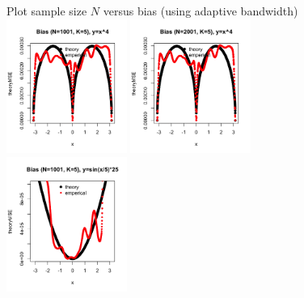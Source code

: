 \documentclass{article}
\begin{document}
\begin{itemize}
\begin{figure}[H]
Plot sample size $N$ versus bias (using adaptive bandwidth)\\
\includegraphics[width=1.55in]{pic/bias6.png}
\includegraphics[width=1.55in]{pic/bias7.png}
\includegraphics[width=1.55in]{pic/bias8.png}
\end{figure}




\end{itemize}
\end{document}
